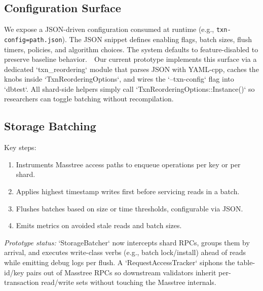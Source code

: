 \documentclass[letterpaper,twocolumn,10pt]{article}
\begin{document}
\subsection{Configuration Surface}
We expose a JSON-driven configuration consumed at runtime (e.g., \texttt{\-\-txn-config=path.json}). The JSON snippet defines enabling flags, batch sizes, flush timers, policies, and algorithm choices. The system defaults to feature-disabled to preserve baseline behavior.\
\
Our current prototype implements this surface via a dedicated `txn_reordering` module that parses JSON with YAML-cpp, caches the knobs inside `TxnReorderingOptions`, and wires the `--txn-config` flag into `dbtest`. All shard-side helpers simply call `TxnReorderingOptions::Instance()` so researchers can toggle batching without recompilation.\

\subsection{Storage Batching}
Key steps:
\begin{enumerate}[leftmargin=*]
  \item Instruments Masstree access paths to enqueue operations per key or per shard.
  \item Applies highest timestamp writes first before servicing reads in a batch.
  \item Flushes batches based on size or time thresholds, configurable via JSON.
  \item Emits metrics on avoided stale reads and batch sizes.
\end{enumerate}
\noindent\textit{Prototype status:} `StorageBatcher` now intercepts shard RPCs, groups them by arrival, and executes write-class verbs (e.g., batch lock/install) ahead of reads while emitting debug logs per flush. A `RequestAccessTracker` siphons the table-id/key pairs out of Masstree RPCs so downstream validators inherit per-transaction read/write sets without touching the Masstree internals.
\end{document}
